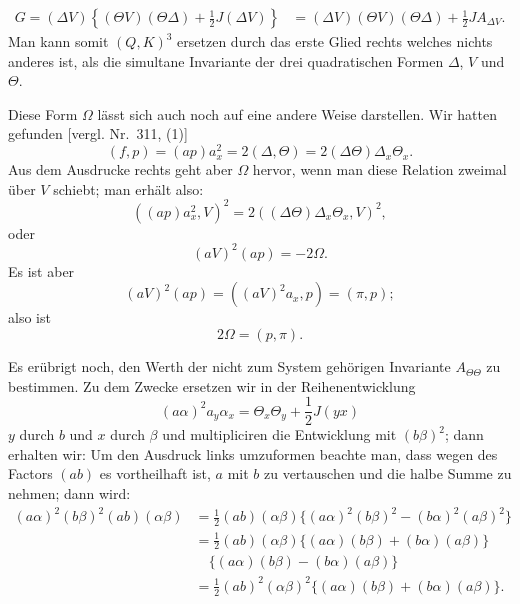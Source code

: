 \[
\begin{aligned}
G = (\Delta V)\left\{(\Theta V)(\Theta\Delta) + \frac{1}{2}J(\Delta V)\right\}
&= (\Delta V)(\Theta V)(\Theta\Delta) + \frac{1}{2}J A_{\Delta V}.
\end{aligned}
\]
Man kann somit $(Q, K)^3$ ersetzen durch das erste Glied rechts
welches nichts anderes ist, als die simultane Invariante der drei
quadratischen Formen $\Delta$, $V$ und $\Theta$.

Diese Form $\Omega$ lässt sich auch noch auf eine andere Weise
darstellen. Wir hatten gefunden [vergl. Nr.\ 311, (1)]
\[
(f, p) = (ap)a_x^2 = 2(\Delta, \Theta) = 2(\Delta\Theta)\Delta_x\Theta_x.
\]
Aus dem Ausdrucke rechts geht aber $\Omega$ hervor, wenn man diese
Relation zweimal über $V$ schiebt; man erhält also:
\[
((ap)a_x^2, V)^2 = 2((\Delta\Theta)\Delta_x\Theta_x, V)^2,
\]
oder
\[
(aV)^2(ap) = -2\Omega.
\]
Es ist aber
\[
(aV)^2(ap) = ((aV)^2a_x, p) = (\pi, p);
\]
also ist
\[
2\Omega = (p, \pi).
\]

Es erübrigt noch, den Werth der nicht zum System gehörigen Invariante
$A_{\Theta\Theta}$ zu bestimmen. Zu dem Zwecke ersetzen wir in der
Reihenentwicklung
\[
(a\alpha)^2a_y\alpha_x = \Theta_x\Theta_y + \frac{1}{2}J(yx)
\]
$y$ durch $b$ und $x$ durch $\beta$ und multipliciren die Entwicklung
mit $(b\beta)^2$; dann erhalten wir:
Um den Ausdruck links umzuformen beachte man, dass wegen des Factors
$(ab)$ es vortheilhaft ist, $a$ mit $b$ zu vertauschen und die halbe
Summe zu nehmen; dann wird:
\[
\begin{aligned}
(a\alpha)^2(b\beta)^2(ab)(\alpha\beta) &= \frac{1}{2}(ab)(\alpha\beta)\{(a\alpha)^2(b\beta)^2 - (b\alpha)^2(a\beta)^2\}\\
&= \frac{1}{2}(ab)(\alpha\beta)\{(a\alpha)(b\beta) + (b\alpha)(a\beta)\}\\
&\quad \{(a\alpha)(b\beta) - (b\alpha)(a\beta)\}\\
&= \frac{1}{2}(ab)^2(\alpha\beta)^2\{(a\alpha)(b\beta) + (b\alpha)(a\beta)\}.
\end{aligned}
\]


